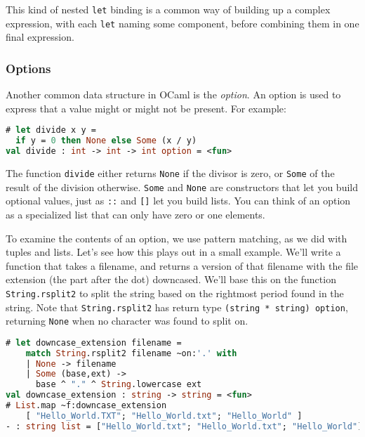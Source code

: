This kind of nested \passthrough{\lstinline!let!} binding is a common
way of building up a complex expression, with each
\passthrough{\lstinline!let!} naming some component, before combining
them in one final expression.

\hypertarget{options}{%
\subsubsection{Options}\label{options}}

Another common data structure in OCaml is the \emph{option}. An option
is used to express that a value might or might not be present. For
example:

\begin{lstlisting}[language=Caml]
# let divide x y =
  if y = 0 then None else Some (x / y)
val divide : int -> int -> int option = <fun>
\end{lstlisting}

The function \passthrough{\lstinline!divide!} either returns
\passthrough{\lstinline!None!} if the divisor is zero, or
\passthrough{\lstinline!Some!} of the result of the division otherwise.
\passthrough{\lstinline!Some!} and \passthrough{\lstinline!None!} are
constructors that let you build optional values, just as
\passthrough{\lstinline!::!} and \passthrough{\lstinline![]!} let you
build lists. You can think of an option as a specialized list that can
only have zero or one elements.

To examine the contents of an option, we use pattern matching, as we did
with tuples and lists. Let's see how this plays out in a small example.
We'll write a function that takes a filename, and returns a version of
that filename with the file extension (the part after the dot)
downcased. We'll base this on the function
\passthrough{\lstinline!String.rsplit2!} to split the string based on
the rightmost period found in the string. Note that
\passthrough{\lstinline!String.rsplit2!} has return type
\passthrough{\lstinline!(string * string) option!}, returning
\passthrough{\lstinline!None!} when no character was found to split on.

\begin{lstlisting}[language=Caml]
# let downcase_extension filename =
    match String.rsplit2 filename ~on:'.' with
    | None -> filename
    | Some (base,ext) ->
      base ^ "." ^ String.lowercase ext
val downcase_extension : string -> string = <fun>
# List.map ~f:downcase_extension
    [ "Hello_World.TXT"; "Hello_World.txt"; "Hello_World" ]
- : string list = ["Hello_World.txt"; "Hello_World.txt"; "Hello_World"]
\end{lstlisting}


